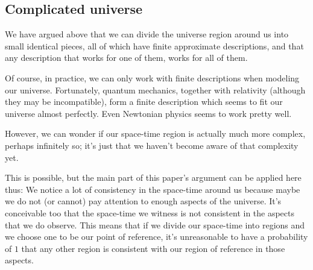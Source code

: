 \documentclass[a4paper
,draft
]{article}
\newcommand{\svn}[2][]{\todo[author=Virgil,color=red!25!white,#1]{#2}}
\def\reale{\mathbb{R}}
\newcommand{\ghilimele}[1]{``#1"}
\begin{document}





\subsection{Complicated universe}

We have argued above that we can divide the universe region around us into small
identical pieces, all of which have finite approximate descriptions, and that
any description that works for one of them, works for all of them.

Of course, in practice, we can only work with finite descriptions when
modeling our universe.
Fortunately, quantum mechanics, together with
relativity (although they may be incompatible), form a finite description which
seems to fit our universe almost perfectly.
Even Newtonian physics seems to work pretty well.

However, we can wonder if our space-time
region is actually much more complex, perhaps infinitely so;
it's just that we haven't become aware of that complexity yet.

This is possible, but the main part of this paper's argument can be applied here thus:
We notice a lot of consistency in the space-time around us
because maybe we do not (or cannot) pay attention to enough aspects of the universe.
It's conceivable too that the space-time we
witness is not consistent in the aspects that we do observe.
This means that if we divide our space-time into regions and we choose one to be our point of reference,
it's unreasonable to have a probability of $1$ that any other
region is consistent with our region of reference in those aspects.
\end{document}
